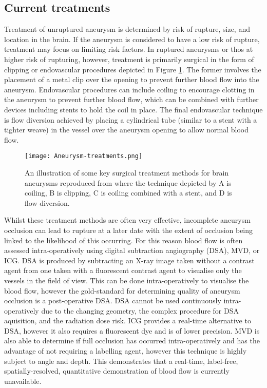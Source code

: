 \subsection{Current treatments}\label{sec:introaneurysmtreatments}
Treatment of unruptured aneurysm is determined by risk of rupture, size, and location in the brain. If the aneurysm is considered to have a low risk of rupture, treatment may focus on limiting risk factors\cite{NationalHealthService2022}. In ruptured aneurysms or thos at higher risk of rupturing, however, treatment is primarily surgical in the form of clipping or endovascular procedures depicted in Figure \ref{fig:aneurysmtreatment}. The former involves the placement of a metal clip over the opening to prevent further blood flow into the aneurysm\cite{TheBrainFoundation2023}. Endovascular procedures can include coiling to encourage clotting in the aneurysm to prevent further blood flow, which can be combined with further devices including stents to hold the coil in place\cite{TheBrainFoundation2023}. The final endovascular technique is flow diversion achieved by placing a cylindrical tube (similar to a stent with a tighter weave) in the vessel over the aneurysm opening to allow normal blood flow\cite{TheBrainFoundation2023}. 
\begin{figure}[h]
    \centering
    \texttt{[image: Aneurysm-treatments.png]}
    \caption{An illustration of some key surgical treatment methods for brain aneurysms reproduced from \cite{TheBrainFoundation2023} where the technique depicted by A is coiling, B is clipping, C is coiling combined with a stent, and D is flow diversion.}
    \label{fig:aneurysmtreatment}
\end{figure}
Whilst these treatment methods are often very effective, incomplete aneurysm occlusion can lead to rupture at a later date with the extent of occlusion being linked to the likelihood of this occurring\cite{Toth2018}. For this reason blood flow is often assessed intra-operatively using digital subtraction angiography (DSA), MVD, or ICG\cite{Norat2019}. DSA is produced by subtracting an X-ray image taken without a contrast agent from one taken with a fluorescent contrast agent to visualise only the vessels in the field of view\cite{Radiopia2022}. This can be done intra-operatively to visualise the blood flow, however the gold-standard for determining quality of aneurysm occlusion is a post-operative DSA\cite{Marbacher2020}. DSA cannot be used continuously intra-operatively due to the changing geometry, the complex procedure for DSA aquisition, and the radiation dose risk\cite{Radiopia2022, Derdeyn1999}. ICG provides a real-time alternative to DSA, however it also requires a fluorescent dye and is of lower precision\cite{Norat2019, Anania2023}. MVD is also able to determine if full occlusion has occurred intra-operatively and has the advantage of not requiring a labelling agent, however this technique is highly subject to angle and depth\cite{Anania2023}. This demonstrates that a real-time, label-free, spatially-resolved, quantitative demonstration of blood flow is currently unavailable. 
